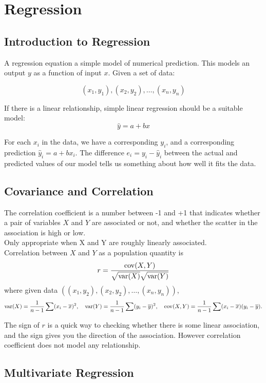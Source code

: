 \section{Regression}

\subsection{Introduction to Regression}

A regression equation a simple model of numerical prediction. This models an output \(y\) as a function of input \(x\). Given a set of data:

\[(x_1, y_1), (x_2, y_2), \dots, (x_n, y_n)\]

If there is a linear relationship, simple linear regression should be a suitable model:
\[\hat{y} = a + bx\]

For each \(x_i\) in the data, we have a corresponding \(y_i\), and a corresponding prediction \(\hat{y}_i = a + bx_i\). The difference \(e_i = y_i - \hat{y}_i\) between the actual and predicted values of our model tells us something about how well it fits the data.

\subsection{Covariance and Correlation}

The correlation coefficient is a number between -1 and +1 that indicates whether a pair of variables \(X\) and \(Y\) are associated or not, and whether the scatter in the association is high or low. \\

Only appropriate when X and Y are roughly linearly associated. \\

Correlation between \(X\) and \(Y\) as a population quantity is
\[r = \frac{\operatorname*{cov}(X, Y)}{\sqrt{\operatorname{var}(X)}\sqrt{\operatorname{var}(Y)}}\]
where given data \(((x_1, y_2), (x_2, y_2), \dots, (x_n, y_n))\),
\[\operatorname{var}(X) = \frac{1}{n - 1} \sum(x_i - \overline{x})^2, \quad \operatorname{var}(Y) = \frac{1}{n - 1}\sum(y_i - \overline{y})^2, \quad \operatorname*{cov}(X, Y) = \frac{1}{n - 1}\sum(x_i - \overline{x})(y_i - \overline{y}).\]

The sign of \(r\) is a quick way to checking whether there is some linear association, and the sign gives you the direction of the association. However correlation coefficient does not model any relationship.

\subsection{Multivariate Regression}

